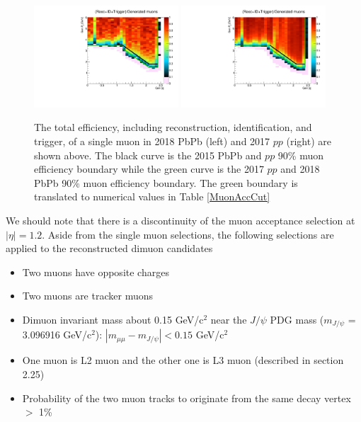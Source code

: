 \begin{figure}[h]
\begin{center}
\includegraphics[width= 0.48\textwidth]{Figures/Chapter5/MuonAccPbPb.pdf}
\includegraphics[width= 0.48\textwidth]{Figures/Chapter5/MuonAccPP.pdf}
\caption{The total efficiency, including reconstruction, identification, and trigger, of a single muon in 2018 PbPb (left) and 2017 $pp$ (right) are shown above. The black curve is the 2015 PbPb and $pp$ 90\% muon efficiency boundary while the green curve is the 2017 $pp$ and 2018 PbPb 90\% muon efficiency boundary. The green boundary is translated to numerical values in Table \ref{MuonAccCut}}
\label{MuonAccPlot}
\end{center}
\end{figure}

We should note that there is a discontinuity of the muon acceptance selection at $|\eta| = 1.2$. Aside from the single muon selections, the following selections are applied to the reconstructed dimuon candidates


\begin{itemize}
\item Two muons have opposite charges 
\item Two muons are tracker muons
\item Dimuon invariant mass about 0.15 GeV/c$^2$ near the $J/\psi$ PDG mass ($m_{J/\psi}$ = 3.096916 GeV/c$^2$): $|m_{\mu\mu} - m_{J/\psi}| < 0.15$ GeV/c$^2$
\item One muon is L2 muon and the other one is L3 muon (described in section 2.25)
\item Probability of the two muon tracks to originate from the same decay vertex $>$ 1\%
\end{itemize}


